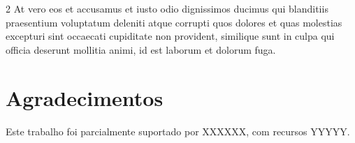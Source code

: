 \documentclass[a0,portrait]{a0poster}
\begin{document}
\begin{mdframed}[style=MyFrame]
\begin{multicols}{2}
At vero eos et accusamus et iusto odio dignissimos ducimus qui blanditiis praesentium voluptatum deleniti atque corrupti quos dolores et quas molestias excepturi sint occaecati cupiditate non provident, similique sunt in culpa qui officia deserunt mollitia animi, id est laborum et dolorum fuga.

\section*{Agradecimentos}
%
Este trabalho foi parcialmente suportado por XXXXXX, com recursos  YYYYY.

%
%

\end{multicols}
\begin{center}
\end{center}
\end{mdframed}
\end{document}
